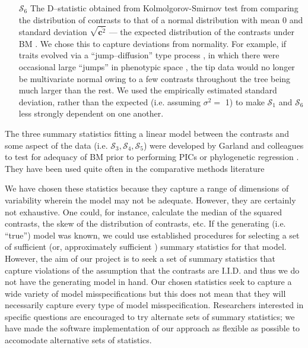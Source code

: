 \documentclass[a4paper,12pt]{article}
\begin{document}
\begin{enumerate}
\item[$\mathcal{S}_6$] The D--statistic obtained from Kolmolgorov-Smirnov test from comparing the distribution of contrasts to that of a normal distribution with mean 0 and standard deviation $\sqrt{\overline{\mathbf{c}^2}}$ --- the expected distribution of the contrasts under BM \citep{Felsenstein1985, Rohlf2001}. We chose this to capture deviations from normality. For example, if traits evolved via a ``jump--diffusion'' type process \citep{Landis2012}, in which there were occasional large ``jumps'' in phenotypic space \citep{PennellPE}, the tip data would no longer be multivariate normal owing to a few contrasts throughout the tree being much larger than the rest.  We used the empirically estimated standard deviation, rather than the expected (i.e. assuming $\sigma^2=$ 1) to make $\mathcal{S}_1$ and $\mathcal{S}_6$ less strongly dependent on one another.

\end{enumerate}

The three summary statistics fitting a linear model between the contrasts and some aspect of the data (i.e. $\mathcal{S}_3, \mathcal{S}_4, \mathcal{S}_5$) were developed by Garland and colleagues \citep{Garland1992, Garland1993,  Diaz1996} to test for adequacy of BM prior to performing PICs \citep{Felsenstein1985} or phylogenetic regression \citep{Grafen1989}. They have been used quite often in the comparative methods literature 

We have chosen these statistics because they capture a range of dimensions of variability wherein the model may not be adequate. However, they are certainly not exhaustive. One could, for instance, calculate the median of the squared contrasts, the skew of the distribution of contrasts, etc. If the generating (i.e. ``true'') model was known, we could use established procedures for selecting a set of sufficient (or, approximately sufficient \citep{ MajoramJoyce}) summary statistics for that model. However, the aim of our project is to seek a set of summary statistics that capture violations of the assumption that the contrasts are I.I.D. and thus we do not have the generating model in hand. Our chosen statistics seek to capture a wide variety of model misspecifications but this does not mean that they will necessarily capture every type of model misspecification. Researchers interested in specific questions are encouraged to try alternate sets of summary statistics; we have made the software implementation of our approach as flexible as possible to accomodate alternative sets of statistics.
\end{document}
